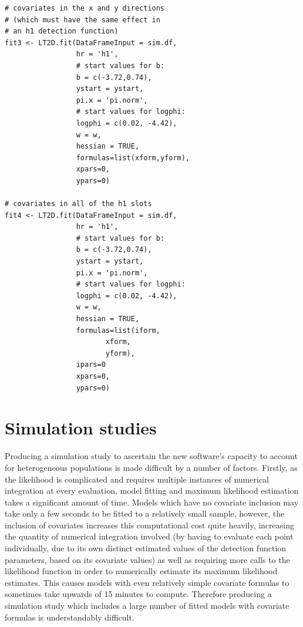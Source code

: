 \documentclass[11pt]{article}
\begin{document}
\begin{multicols}{2}
\begin{lstlisting}
# covariates in the x and y directions
# (which must have the same effect in 
# an h1 detection function)
fit3 <- LT2D.fit(DataFrameInput = sim.df,
                 hr = 'h1',
                 # start values for b:
                 b = c(-3.72,0.74),
                 ystart = ystart,
                 pi.x = 'pi.norm',
                 # start values for logphi:
                 logphi = c(0.02, -4.42),
                 w = w,
                 hessian = TRUE,
                 formulas=list(xform,yform),
                 xpars=0,
                 ypars=0)

# covariates in all of the h1 slots
fit4 <- LT2D.fit(DataFrameInput = sim.df,
                 hr = 'h1',
                 # start values for b:
                 b = c(-3.72,0.74),
                 ystart = ystart,
                 pi.x = 'pi.norm',
                 # start values for logphi:
                 logphi = c(0.02, -4.42),
                 w = w,
                 hessian = TRUE,
                 formulas=list(iform,
                 		xform,
                 		yform),
                 ipars=0
                 xpars=0,
                 ypars=0)
\end{lstlisting}
\endgroup


\section{Simulation studies}
Producing a simulation study to ascertain the new software's capacity to account for heterogeneous populations is made difficult by a number of factors. Firstly, as the \cite{Borchers} likelihood is complicated and requires multiple instances of numerical integration at every evaluation, model fitting and maximum likelihood estimation takes a significant amount of time. Models which have no covariate inclusion may take only a few seconds to be fitted to a relatively small sample, however, the inclusion of covariates increases this computational cost quite heavily, increasing the quantity of numerical integration involved (by having to evaluate each point individually, due to its own distinct estimated values of the detection function parameters, based on its covariate values) as well as requiring more calls to the likelihood function in order to numerically estimate its maximum likelihood estimates. This causes models with even relatively simple covariate formulas to sometimes take upwards of 15 minutes to compute. Therefore producing a simulation study which includes a large number of fitted models with covariate formulas is understandably difficult.


\end{multicols}
\end{document}
